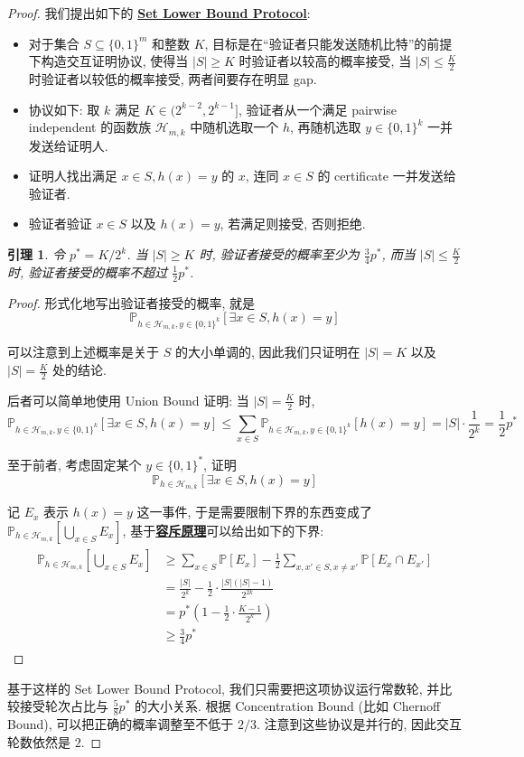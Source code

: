\documentclass[8pt]{article}
\theoremstyle{compact}
\newtheorem{lemma}[theorem]{引理}
\def\obj#1{\textbf{\uline{#1}}}
\def\le{\leqslant}
\def\ge{\geqslant}
\begin{document}
\begin{proof}
	我们提出如下的 \obj{Set Lower Bound Protocol}:
	\begin{itemize}
		\item 对于集合 $S \subseteq \{0, 1\}^m$ 和整数 $K$, 目标是在“验证者只能发送随机比特”的前提下构造交互证明协议, 使得当 $|S| \ge K$ 时验证者以较高的概率接受, 当 $|S| \le \frac{K}{2}$ 时验证者以较低的概率接受, 两者间要存在明显 gap.
	    \item 协议如下: 取 $k$ 满足 $K \in (2^{k-2}, 2^{k-1}]$, 验证者从一个满足 pairwise independent 的函数族 $\mathcal H_{m, k}$ 中随机选取一个 $h$, 再随机选取 $y \in \{0, 1\}^k$ 一并发送给证明人.
        \item 证明人找出满足 $x \in S, h(x) = y$ 的 $x$, 连同 $x \in S$ 的 certificate 一并发送给验证者.
        \item 验证者验证 $x \in S$ 以及 $h(x) = y$, 若满足则接受, 否则拒绝.
	\end{itemize}
	\begin{lemma}
		令 $p^* = K / 2^k$. 当 $|S| \ge K$ 时, 验证者接受的概率至少为 $\frac34 p^*$, 而当 $|S| \le \frac{K}{2}$ 时, 验证者接受的概率不超过 $\frac12 p^*$.
	\end{lemma}
	\begin{proof}
		形式化地写出验证者接受的概率, 就是 $$\mathbb P_{h \in \mathcal H_{m, k}, y \in \{0, 1\}^k} [\exists x \in S, h(x) = y]$$

		可以注意到上述概率是关于 $S$ 的大小单调的, 因此我们只证明在 $|S| = K$ 以及 $|S| = \frac K2$ 处的结论.
		
		后者可以简单地使用 Union Bound 证明: 当 $|S| = \frac{K}{2}$ 时,  $$\mathbb P_{h \in \mathcal H_{m, k}, y \in \{0, 1\}^k} [\exists x \in S, h(x) = y] \le \sum_{x \in S} \mathbb P_{h \in \mathcal H_{m, k}, y \in \{0, 1\}^k} [h(x) = y] = |S| \cdot \frac{1}{2^k} = \frac12 p^*$$

		至于前者, 考虑固定某个 $y \in \{0, 1\}^*$, 证明 $$\mathbb P_{h \in \mathcal H_{m, k}} [\exists x \in S, h(x) = y]$$

		记 $E_x$ 表示 $h(x) = y$ 这一事件, 于是需要限制下界的东西变成了 $\mathbb P_{h \in \mathcal H_{m, k}} \left[\bigcup_{x \in S} E_x\right]$, 基于\obj{容斥原理}可以给出如下的下界: 
		\begin{align*}
			\begin{split}
				\mathbb P_{h \in \mathcal H_{m, k}} \left[\bigcup_{x \in S} E_x\right] &\ge \sum_{x \in S}\mathbb P[E_x] - \frac12\sum_{x, x' \in S, x \neq x'}\mathbb P[E_x \cap E_{x'}] \\&= \frac{|S|}{2^k} - \frac12 \cdot \frac{|S|(|S| - 1)}{2^{2k}} \\&= p^*\left(1 - \frac12 \cdot \frac{K-1}{2^k}\right) \\&\ge \frac34 p^*
			\end{split}
		\end{align*}
	\end{proof}

	基于这样的 Set Lower Bound Protocol, 我们只需要把这项协议运行常数轮, 并比较接受轮次占比与 $\frac58 p^*$ 的大小关系. 根据 Concentration Bound (比如 Chernoff Bound), 可以把正确的概率调整至不低于 $2/3$. 注意到这些协议是并行的, 因此交互轮数依然是 $2$.
\end{proof}
\end{document}
